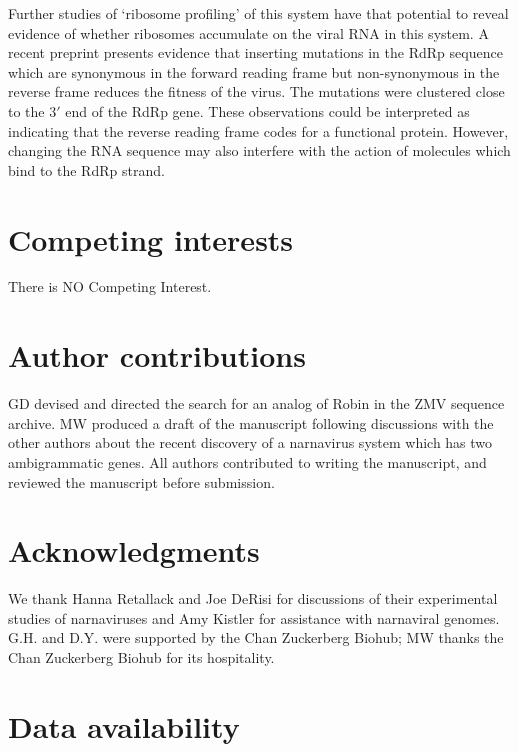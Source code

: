 \documentclass[unnumsec,webpdf,contemporary,large,namedate]{oup-authoring-template}%
\theoremstyle{thmstyleone}%
\theoremstyle{thmstyletwo}%
\theoremstyle{thmstylethree}%
\begin{document}
Further studies of \lq ribosome profiling' of this system have that potential to reveal evidence 
of whether ribosomes accumulate on the viral RNA in this system.  A recent preprint \citep{Ret+20} 
presents evidence that inserting mutations in the RdRp sequence which are synonymous in the forward 
reading frame but non-synonymous in the reverse frame reduces the fitness of the virus. The mutations 
were clustered close to the $3'$ end of the RdRp gene. These 
observations could be interpreted as indicating that the reverse reading frame codes for a functional 
protein. However, changing the RNA sequence may also interfere with the action of molecules which 
bind to the RdRp strand.


\section{Competing interests}
There is NO Competing Interest.

\section{Author contributions}

GD devised and directed the search for an analog of Robin in the ZMV sequence
archive. MW produced a draft of the manuscript following discussions with the other 
authors about the recent discovery of a narnavirus system which has two 
ambigrammatic genes. All authors contributed to writing the manuscript, and 
reviewed the manuscript before submission. 


\section{Acknowledgments}

We thank Hanna Retallack and Joe DeRisi for discussions of their experimental studies of narnaviruses
and Amy Kistler for assistance with narnaviral genomes.
G.H. and D.Y. were supported by the Chan Zuckerberg Biohub;
MW thanks the Chan Zuckerberg Biohub for its hospitality. 

\section{Data availability}






%
%
\end{document}
